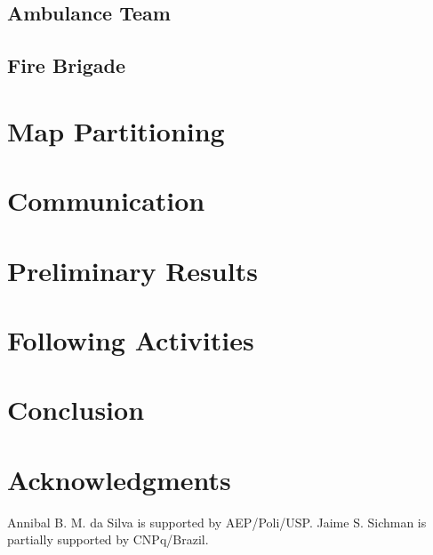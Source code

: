 \documentclass{llncs}
\begin{document}
\subsection{Ambulance Team}
	\label{subsec:ambulanceTeam}
	

\subsection{Fire Brigade}
	\label{subsec:fireBrigade}
	

\section{Map Partitioning}
	\label{sec:partitioning}
	

\section{Communication}
	\label{sec:communication}
	

\section{Preliminary Results}
	\label{sec:preResults}
	
	
\section{Following Activities}
	\label{sec:followingActivities}
	

\section{Conclusion}
	\label{sec:conclusion}
	

\section*{Acknowledgments}
\label{sec:acknowledgments}
Annibal B. M. da Silva is supported by AEP/Poli/USP. Jaime S. Sichman is partially supported by CNPq/Brazil.


\end{document}

